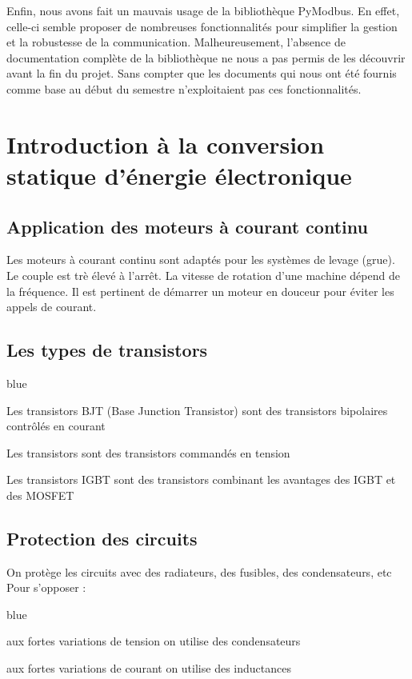 {Enfin, nous avons fait un mauvais usage de la bibliothèque PyModbus. En effet, celle-ci semble proposer de nombreuses fonctionnalités pour simplifier la gestion et la robustesse de la communication. Malheureusement, l'absence de documentation complète de la bibliothèque ne nous a pas permis de les découvrir avant la fin du projet. Sans compter que les documents qui nous ont été fournis comme base au début du semestre n'exploitaient pas ces fonctionnalités.
\chapter{Introduction à la conversion statique d'énergie électronique}

\section{Application des moteurs à courant continu}

Les moteurs à courant continu sont adaptés pour les systèmes de levage (grue). Le couple est trè élevé à l'arrêt.
La vitesse de rotation d'une machine dépend de la fréquence.
Il est pertinent de démarrer un moteur en douceur pour éviter les appels de courant.
\section{Les types de transistors}

\begin{items}{blue}{\Triangle}
    \item Les transistors BJT (Base Junction Transistor) sont des transistors bipolaires contrôlés en courant
    \item Les transistors  sont des transistors commandés en tension
    \item Les transistors IGBT sont des transistors combinant les avantages des  IGBT et des MOSFET
\end{items}

\section{Protection des circuits}


On protège les circuits avec des radiateurs, des fusibles, des condensateurs, etc\\
Pour s'opposer : 
\begin{items}{blue}{\Triangle}
    \item aux fortes variations de tension on utilise des condensateurs
    \item aux fortes variations de courant on utilise des inductances
\end{items}

}
